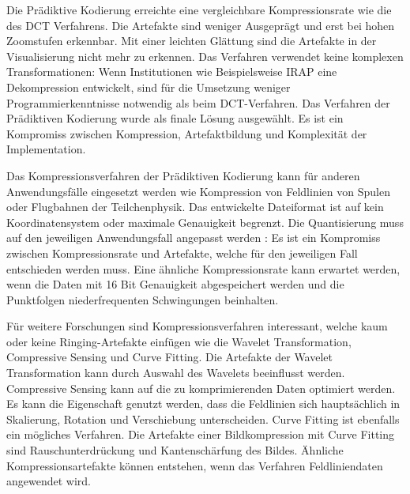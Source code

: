 Die Prädiktive Kodierung erreichte eine vergleichbare Kompressionsrate wie die des DCT Verfahrens. Die Artefakte sind weniger Ausgeprägt und erst bei hohen Zoomstufen erkennbar. Mit einer leichten Glättung sind die Artefakte in der Visualisierung nicht mehr zu erkennen. Das Verfahren verwendet keine komplexen Transformationen: Wenn Institutionen wie Beispielsweise IRAP \cite{website:irap} eine Dekompression entwickelt, sind für die Umsetzung weniger Programmierkenntnisse notwendig als beim DCT-Verfahren. Das Verfahren der Prädiktiven Kodierung wurde als finale Lösung ausgewählt. Es ist ein Kompromiss zwischen Kompression, Artefaktbildung und Komplexität der Implementation.

Das Kompressionsverfahren der Prädiktiven Kodierung kann für anderen Anwendungsfälle eingesetzt werden wie Kompression von Feldlinien von Spulen oder Flugbahnen der Teilchenphysik. Das entwickelte Dateiformat ist auf kein Koordinatensystem oder maximale Genauigkeit begrenzt. Die Quantisierung muss auf den jeweiligen Anwendungsfall angepasst werden : Es ist ein Kompromiss zwischen Kompressionsrate und Artefakte, welche für den jeweiligen Fall entschieden werden muss. Eine ähnliche Kompressionsrate kann erwartet werden, wenn die Daten mit 16 Bit Genauigkeit abgespeichert werden und die Punktfolgen niederfrequenten Schwingungen beinhalten.

Für weitere Forschungen sind Kompressionsverfahren interessant, welche kaum oder keine Ringing-Artefakte einfügen wie die Wavelet Transformation, Compressive Sensing und Curve Fitting. Die Artefakte der Wavelet Transformation kann durch Auswahl des Wavelets beeinflusst werden. Compressive Sensing kann auf die zu komprimierenden Daten optimiert werden. Es kann die Eigenschaft genutzt werden, dass die Feldlinien sich hauptsächlich in Skalierung, Rotation und Verschiebung unterscheiden. Curve Fitting ist ebenfalls ein mögliches Verfahren. Die Artefakte einer Bildkompression mit Curve Fitting sind Rauschunterdrückung und Kantenschärfung des Bildes. Ähnliche Kompressionsartefakte können entstehen, wenn das Verfahren Feldliniendaten angewendet wird.